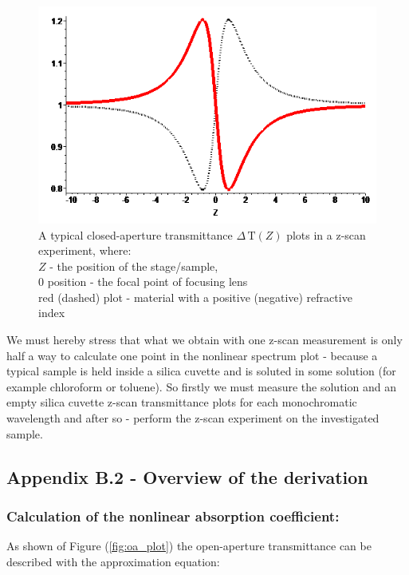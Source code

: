 \documentclass[12pt,twoside,a4paper]{article}
\numberwithin{equation}{subsection}
\numberwithin{figure}{subsection}
\begin{document}
\begin{figure}
  \includegraphics{img/ca_plot.png}
  \caption{A typical closed-aperture transmittance $\Delta \,\mathrm{T}(Z)$ plots in a z-scan experiment, where: \\  
    $Z$ - the position of the stage/sample, \\
    $0$ position - the focal point of focusing lens \\
    red (dashed) plot - material with a positive (negative) refractive index
    \label{fig:ca_plot}}
\end{figure}

We must hereby stress that what we obtain with one z-scan measurement is only half a way to calculate one point in the nonlinear
spectrum plot - because a typical sample is held inside a silica cuvette and is soluted in some solution (for example chloroform or
toluene). So firstly we must measure the solution and an empty silica cuvette z-scan transmittance plots for each monochromatic
wavelength and after so - perform the z-scan experiment on the investigated sample. 

\subsection*{Appendix B.2 - Overview of the derivation} \label{chap:zscan_derivation}

\subsubsection*{Calculation of the nonlinear absorption coefficient:}

As shown of Figure (\ref{fig:oa_plot}) the open-aperture transmittance can be described with the approximation equation:
\end{document}
